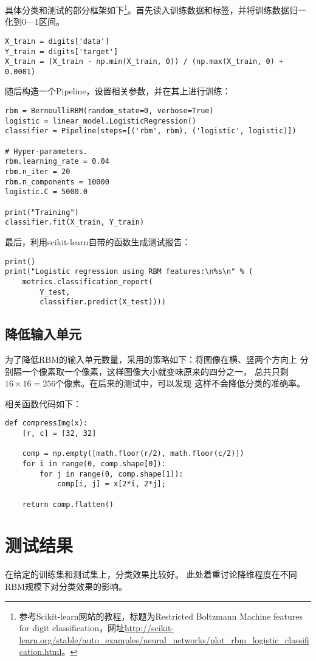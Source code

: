 \documentclass{ctexart}
\begin{document}
具体分类和测试的部分框架如下\footnote{参考Scikit-learn网站的教程，标题为Restricted Boltzmann Machine features for digit classification，网址\url{http://scikit-learn.org/stable/auto_examples/neural_networks/plot_rbm_logistic_classification.html}。}。首先读入训练数据和标签，并将训练数据归一化到0—1区间。
\begin{verbatim}
X_train = digits['data']
Y_train = digits['target']
X_train = (X_train - np.min(X_train, 0)) / (np.max(X_train, 0) + 0.0001)
\end{verbatim}

随后构造一个Pipeline，设置相关参数，并在其上进行训练：
\begin{verbatim}
rbm = BernoulliRBM(random_state=0, verbose=True)
logistic = linear_model.LogisticRegression()
classifier = Pipeline(steps=[('rbm', rbm), ('logistic', logistic)])

# Hyper-parameters.
rbm.learning_rate = 0.04
rbm.n_iter = 20
rbm.n_components = 10000
logistic.C = 5000.0

print("Training")
classifier.fit(X_train, Y_train)
\end{verbatim}

最后，利用scikit-learn自带的函数生成测试报告：
\begin{verbatim}
print()
print("Logistic regression using RBM features:\n%s\n" % (
    metrics.classification_report(
        Y_test,
        classifier.predict(X_test))))
\end{verbatim}

\subsection{降低输入单元}
为了降低RBM的输入单元数量，采用的策略如下：将图像在横、竖两个方向上
分别隔一个像素取一个像素，这样图像大小就变味原来的四分之一，
总共只剩$16 \times 16=256$个像素。在后来的测试中，可以发现
这样不会降低分类的准确率。

相关函数代码如下：
\begin{verbatim}
def compressImg(x):
    [r, c] = [32, 32]

    comp = np.empty([math.floor(r/2), math.floor(c/2)])
    for i in range(0, comp.shape[0]):
        for j in range(0, comp.shape[1]):
            comp[i, j] = x[2*i, 2*j];

    return comp.flatten()
\end{verbatim}

\section{测试结果}
在给定的训练集和测试集上，分类效果比较好。
此处着重讨论降维程度在不同RBM规模下对分类效果的影响。
\end{document}
